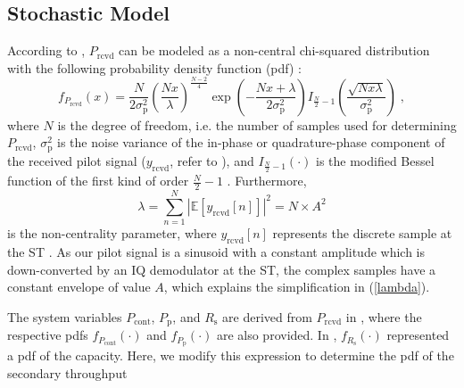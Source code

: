 \subsection{Stochastic Model}
\label{model}
According to \cite{Kaushik15}, $P_\textrm{rcvd}$ can be modeled as a non-central chi-squared distribution with the following probability density function (pdf) \cite{cha99}:
\begin{equation}
	\label{nxc2equ}
	f_{P_\textrm{rcvd}} \left(x\right) = 
	\frac{N}{2\sigma_\textrm{p}^2} \left(\frac{N x}{\lambda}\right)^\frac{N-2}{4}  
	\exp\left(-\frac{N x+\lambda}{2\sigma_\textrm{p}^2}\right)  I_{\frac{N}{2}-1}\left(\frac{\sqrt{N x\lambda}}{\sigma_\textrm{p}^2}\right) \;  ,
\end{equation}
where $N$ is the degree of freedom, i.e. the number of samples used for determining ${P_\textrm{rcvd}}$, $\sigma_\textrm{p}^2$ is the noise variance of the in-phase or quadrature-phase component of the received pilot signal ($y_\textrm{rcvd}$, refer to \cite{Kaushik15}), and $I_{\frac{N}{2}-1}(\cdot)$ is the modified Bessel function of the first kind of order $\frac{N}{2}-1$ \cite{Jef00}. Furthermore,
\begin{equation}
	\label{lambda}
	\lambda = \sum_{n=1}^N |\mathbb{E}\left[y_\textrm{rcvd}[n]\right]|^2 = N \times A^2
\end{equation}
is the non-centrality parameter, where $y_\textrm{rcvd}[n]$ represents the discrete sample at the ST \cite{Kaushik15}. As our pilot signal is a sinusoid with a constant amplitude which is down-converted by an IQ demodulator at the ST, the complex samples have a constant envelope of value $A$, which explains the simplification in (\ref{lambda}).

The system variables $P_\textrm{cont}$, $P_\textrm{p}$, and $R_\textrm{s}$ are derived from $P_\textrm{rcvd}$ in \cite{Kaushik15}, where the respective pdfs $f_{P_\textrm{cont}}(\cdot)$ and $f_{P_\textrm{p}}(\cdot)$ are also provided. In \cite{Kaushik15}, $f_{R_\textrm{s}}(\cdot)$ represented a pdf of the capacity. Here, we modify this expression to determine the pdf of the secondary throughput

